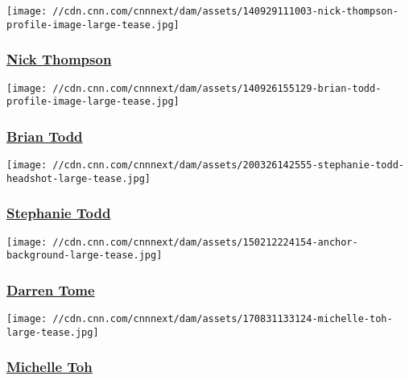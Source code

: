 \href{/profiles/nick-thompson}{}

\texttt{[image: //cdn.cnn.com/cnnnext/dam/assets/140929111003-nick-thompson-profile-image-large-tease.jpg]}

\hypertarget{nick-thompson}{%
\subsubsection{\texorpdfstring{\href{/profiles/nick-thompson}{Nick
Thompson}}{Nick Thompson}}\label{nick-thompson}}

\href{/profiles/brian-todd-profile}{}

\texttt{[image: //cdn.cnn.com/cnnnext/dam/assets/140926155129-brian-todd-profile-image-large-tease.jpg]}

\hypertarget{brian-todd}{%
\subsubsection{\texorpdfstring{\href{/profiles/brian-todd-profile}{Brian
Todd}}{Brian Todd}}\label{brian-todd}}

\href{/profiles/stephanie-todd}{}

\texttt{[image: //cdn.cnn.com/cnnnext/dam/assets/200326142555-stephanie-todd-headshot-large-tease.jpg]}

\hypertarget{stephanie-todd}{%
\subsubsection{\texorpdfstring{\href{/profiles/stephanie-todd}{Stephanie
Todd}}{Stephanie Todd}}\label{stephanie-todd}}

\href{/profiles/darren-tome}{}

\texttt{[image: //cdn.cnn.com/cnnnext/dam/assets/150212224154-anchor-background-large-tease.jpg]}

\hypertarget{darren-tome}{%
\subsubsection{\texorpdfstring{\href{/profiles/darren-tome}{Darren
Tome}}{Darren Tome}}\label{darren-tome}}

\href{/profiles/michelle-toh-profile}{}

\texttt{[image: //cdn.cnn.com/cnnnext/dam/assets/170831133124-michelle-toh-large-tease.jpg]}

\hypertarget{michelle-toh-}{%
\subsubsection{\texorpdfstring{\href{/profiles/michelle-toh-profile}{Michelle
Toh }}{Michelle Toh }}\label{michelle-toh-}}

